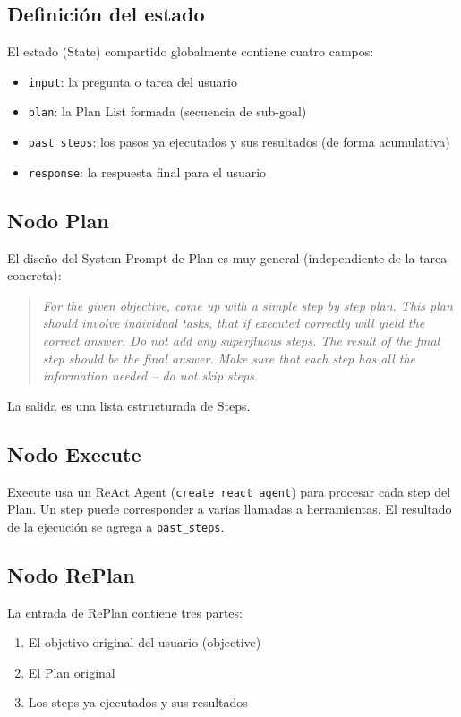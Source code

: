 \documentclass[a4paper]{article}
\begin{document}
\subsection{Definición del estado}

El estado (State) compartido globalmente contiene cuatro campos:
\begin{itemize}
    \item \texttt{input}: la pregunta o tarea del usuario
    \item \texttt{plan}: la Plan List formada (secuencia de sub-goal)
    \item \texttt{past\_steps}: los pasos ya ejecutados y sus resultados (de forma acumulativa)
    \item \texttt{response}: la respuesta final para el usuario
\end{itemize}

\subsection{Nodo Plan}

El diseño del System Prompt de Plan es muy general (independiente de la tarea concreta):
\begin{quote}
\textit{For the given objective, come up with a simple step by step plan. This plan should involve individual tasks, that if executed correctly will yield the correct answer. Do not add any superfluous steps. The result of the final step should be the final answer. Make sure that each step has all the information needed -- do not skip steps.}
\end{quote}

La salida es una lista estructurada de Steps.

\subsection{Nodo Execute}

Execute usa un ReAct Agent (\texttt{create\_react\_agent}) para procesar cada step del Plan. Un step puede corresponder a varias llamadas a herramientas. El resultado de la ejecución se agrega a \texttt{past\_steps}.

\subsection{Nodo RePlan}

La entrada de RePlan contiene tres partes:
\begin{enumerate}
    \item El objetivo original del usuario (objective)
    \item El Plan original
    \item Los steps ya ejecutados y sus resultados
\end{enumerate}
\end{document}

